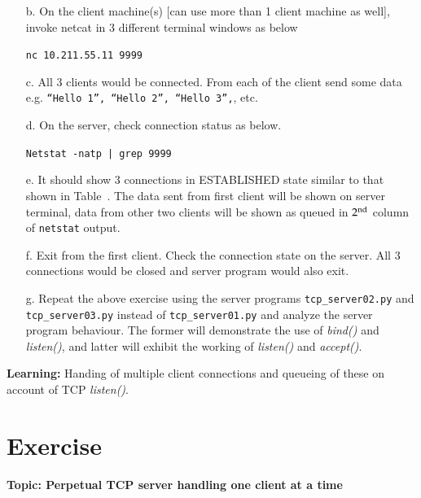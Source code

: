 \begin{multicols}{2}
\begin{itemize}
\item[b.] On the client machine(s) [can use more than 1 client machine as well], invoke netcat in 3 different terminal windows as below

\texttt{nc 10.211.55.11 9999}

\item[c.] All 3 clients would be connected. From each of the client send some data e.g. \texttt{“Hello 1”, “Hello 2”, “Hello 3”,}, etc.

\item[d.] On the server, check connection status as below.

\texttt{Netstat -natp | grep 9999}

\item[e.] It should show 3 connections in ESTABLISHED state similar to that shown in Table~\cite{art1-tab06}. The data sent from first client will be shown on server terminal, data from other two clients will be shown as queued in $2^{\rm nd}$ column of \texttt{netstat} output.

\item[f.] Exit from the first client. Check the connection state on the server. All 3 connections would be closed and server program would also exit.

\item[g.] Repeat the above exercise using the server programs \texttt{tcp\_server02.py} and \texttt{tcp\_server03.py} instead of \texttt{tcp\_server01.py} and analyze the server program behaviour. The former will demonstrate the use of \textit{bind()} and \textit{listen()}, and latter will exhibit the working of \textit{listen()} and \textit{accept()}.
\end{itemize}

\vspace{-.3cm}

\textbf{Learning:} Handing of multiple client connections and queueing of these on account of TCP \textit{listen()}.

\vspace{-.3cm}

\section*{Exercise \label{chap1-exe02}}

\textbf{Topic: Perpetual TCP server handling one client at a time}

\begin{itemize}


\end{itemize}
\end{multicols}
